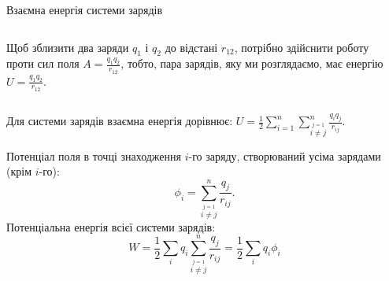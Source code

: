\documentclass[onlytextwidth]{beamer}
\begin{document}
\begin{frame}{Взаємна енергія системи зарядів}\small
	\begin{columns}
		\begin{column}{0.8\linewidth}
			\begin{block}{}\justifying
				Щоб зблизити два заряди $q_1$ і $q_2$ до відстані $r_{12}$, потрібно здійснити
				роботу проти сил поля $A = \frac{q_1q_2}{r_{12}}$, тобто, пара зарядів, яку ми
				розглядаємо, має енергію $ U = \frac{q_1q_2}{r_{12}} $.
			\end{block}
		\end{column}
		\begin{column}{0.2\linewidth}\centering

		\end{column}
	\end{columns}
	\begin{block}{}
		Для системи зарядів взаємна енергія дорівнює:
		$
			U = \frac12\sum\limits_{i = 1}^n\sum\limits_{\stackrel{j = 1}{i \neq j}}^n
			\frac{q_iq_j}{r_{ij}}
		$.
	\end{block}
	\begin{block}{}\justifying
		Потенціал поля в точці знаходження $i$-го заряду, створюваний усіма зарядами (крім $i$-го):
		\begin{equation*}
			\phi_i = \sum\limits_{\stackrel{j = 1}{i \neq j}}^n \frac{q_j}{r_{ij}}.
		\end{equation*}
		Потенціальна енергія всієї системи зарядів:
		\begin{equation*}
			W = \frac12\sum_iq_i\sum\limits_{\stackrel{j = 1}{i \neq j}}^n \frac{q_j}{r_{ij}} =
			\frac12
			\sum_i q_i\phi_i
		\end{equation*}
	\end{block}
\end{frame}
\end{document}
